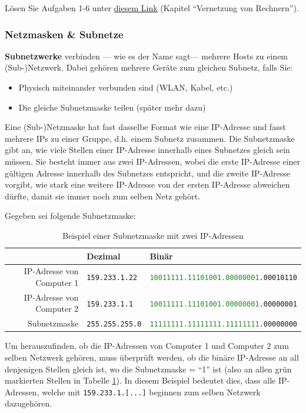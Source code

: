 \begin{mychallenge}
	Lösen Sie Aufgaben 1-6 unter \href{https://inf-schule.de/rechnernetze/filius/vernetzungrechner/erkundung_zweirechner}{diesem Link} (Kapitel ``Vernetzung von Rechnern'').
\end{mychallenge}


\subsubsection{Netzmasken \& Subnetze}
\textbf{Subnetzwerke} verbinden --- wie es der Name sagt--- mehrere Hosts zu einem (Sub-)Netzwerk. Dabei gehören mehrere Geräte zum gleichen Subnetz, falls Sie:
\begin{itemize}
	\item Physisch miteinander verbunden sind (WLAN, Kabel, etc.)
	\item Die gleiche Subnetzmaske teilen (später mehr dazu)
\end{itemize}

Eine (Sub-)Netzmaske hat fast dasselbe Format wie eine IP-Adresse und fasst mehrere IPs zu einer Gruppe, d.h. einem Subnetz zusammen. Die Subnetzmaske gibt an, wie viele Stellen einer IP-Adresse innerhalb eines Subnetzes gleich sein müssen. Sie besteht immer aus zwei IP-Adressen, wobei die erste IP-Adresse einer gültigen Adresse innerhalb des Subnetzes entspricht, und die zweite IP-Adresse vorgibt, wie stark eine weitere IP-Adresse von der ersten IP-Adresse abweichen dürfte, damit sie immer noch zum selben Netz gehört.

\begin{myexample}
Gegeben sei folgende Subnetzmaske:
\begin{table}[H]
	\centering
	\begin{tabular}{r|l|l}
		                                     & Dezimal                & Binär                                                                 \\\midrule\midrule
		\acrshort{IP}-Adresse von Computer 1 & \texttt{159.233.1.22}  & \texttt{\textcolor{ForestGreen}{10011111.11101001.00000001}.00010110} \\\midrule
		\acrshort{IP}-Adresse von Computer 2 & \texttt{159.233.1.1}   & \texttt{\textcolor{ForestGreen}{10011111.11101001.00000001}.00000001} \\\midrule
		Subnetzmaske                         & \texttt{255.255.255.0} & \texttt{\textcolor{ForestGreen}{11111111.11111111.11111111}.00000000}
	\end{tabular}
	\caption{Beispiel einer Subnetzmaske mit zwei IP-Adressen}
	\label{table:ex-subnet}
\end{table}
Um herauszufinden, ob die IP-Adressen von Computer 1 und Computer 2 zum selben Netzwerk gehören, muss überprüft werden, ob die binäre IP-Adresse an all denjenigen Stellen gleich ist, wo die Subnetzmaske = ``1'' ist (also an allen grün markierten Stellen in Tabelle \cref{table:ex-subnet}). In diesem Beispiel bedeutet dies, dass alle \gls{IP}-Adressen, welche mit \texttt{159.233.1.[...]} beginnen zum selben Netzwerk dazugehören.
\end{myexample}



